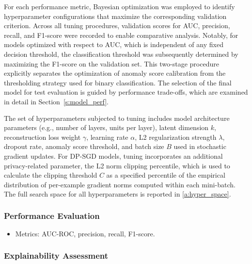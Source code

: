 For each performance metric, Bayesian optimization was employed to identify hyperparameter configurations that maximize the corresponding validation criterion. Across all tuning procedures, validation scores for AUC, precision, recall, and F1-score were recorded to enable comparative analysis. Notably, for models optimized with respect to AUC, which is independent of any fixed decision threshold, the classification threshold was subsequently determined by maximizing the F1-score on the validation set. This two-stage procedure explicitly separates the optimization of anomaly score calibration from the thresholding strategy used for binary classification. The selection of the final model for test evaluation is guided by performance trade-offs, which are examined in detail in Section~\ref{s:model_perf}.

The set of hyperparameters subjected to tuning includes model architecture parameters (e.g., number of layers, units per layer), latent dimension $k$, reconstruction loss weight $\gamma$, learning rate $\alpha$, L2 regularization strength $\lambda$, dropout rate, anomaly score threshold, and batch size $B$ used in stochastic gradient updates. For DP-SGD models, tuning incorporates an additional privacy-related parameter, the L2 norm clipping percentile, which is used to calculate the clipping threshold \(C\) as a specified percentile of the empirical distribution of per-example gradient norms computed within each mini-batch. The full search space for all hyperparameters is reported in \ref{a:hyper_space}.

\subsubsection{Performance Evaluation}
\begin{itemize}
    \item Metrics: AUC-ROC, precision, recall, F1-score.

\end{itemize}

\subsubsection{Explainability Assessment}

